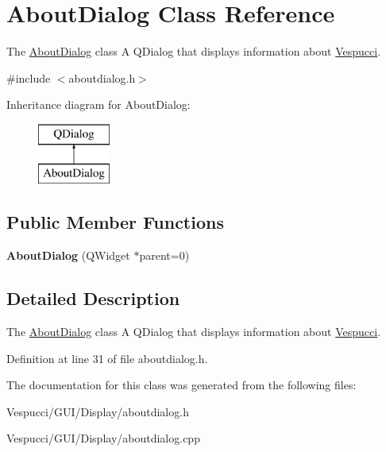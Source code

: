 \hypertarget{class_about_dialog}{}\section{About\+Dialog Class Reference}
\label{class_about_dialog}


The \hyperlink{class_about_dialog}{About\+Dialog} class A Q\+Dialog that displays information about \hyperlink{namespace_vespucci}{Vespucci}.  




{\ttfamily \#include $<$aboutdialog.\+h$>$}

Inheritance diagram for About\+Dialog\+:\begin{figure}[H]
\begin{center}
\leavevmode
\includegraphics[height=2.000000cm]{class_about_dialog}
\end{center}
\end{figure}
\subsection*{Public Member Functions}
\begin{DoxyCompactItemize}
\item 
{\bfseries About\+Dialog} (Q\+Widget $\ast$parent=0)\hypertarget{class_about_dialog_ad96fc2ce8de7568ace543b7c69c71c56}{}\label{class_about_dialog_ad96fc2ce8de7568ace543b7c69c71c56}

\end{DoxyCompactItemize}


\subsection{Detailed Description}
The \hyperlink{class_about_dialog}{About\+Dialog} class A Q\+Dialog that displays information about \hyperlink{namespace_vespucci}{Vespucci}. 

Definition at line 31 of file aboutdialog.\+h.



The documentation for this class was generated from the following files\+:\begin{DoxyCompactItemize}
\item 
Vespucci/\+G\+U\+I/\+Display/aboutdialog.\+h\item 
Vespucci/\+G\+U\+I/\+Display/aboutdialog.\+cpp\end{DoxyCompactItemize}
